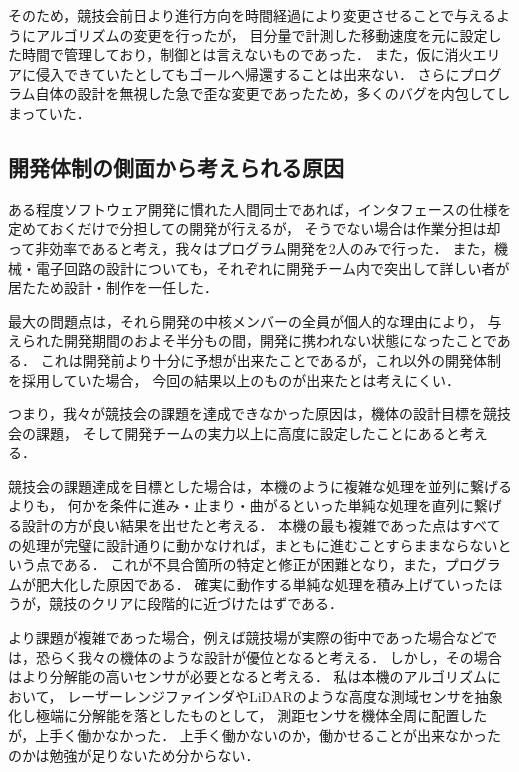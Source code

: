 \documentclass[11pt,a4]{jsarticle}
\begin{document}
    そのため，競技会前日より進行方向を時間経過により変更させることで与えるようにアルゴリズムの変更を行ったが，
    目分量で計測した移動速度を元に設定した時間で管理しており，制御とは言えないものであった．
    また，仮に消火エリアに侵入できていたとしてもゴールへ帰還することは出来ない．
    さらにプログラム自体の設計を無視した急で歪な変更であったため，多くのバグを内包してしまっていた．

  \subsection{開発体制の側面から考えられる原因} %
    ある程度ソフトウェア開発に慣れた人間同士であれば，インタフェースの仕様を定めておくだけで分担しての開発が行えるが，
    そうでない場合は作業分担は却って非効率であると考え，我々はプログラム開発を2人のみで行った．
    また，機械・電子回路の設計についても，それぞれに開発チーム内で突出して詳しい者が居たため設計・制作を一任した．

    最大の問題点は，それら開発の中核メンバーの全員が個人的な理由により，
    与えられた開発期間のおよそ半分もの間，開発に携われない状態になったことである．
    これは開発前より十分に予想が出来たことであるが，これ以外の開発体制を採用していた場合，
    今回の結果以上のものが出来たとは考えにくい．

    つまり，我々が競技会の課題を達成できなかった原因は，機体の設計目標を競技会の課題，
    そして開発チームの実力以上に高度に設定したことにあると考える．

    競技会の課題達成を目標とした場合は，本機のように複雑な処理を並列に繋げるよりも，
    何かを条件に進み・止まり・曲がるといった単純な処理を直列に繋げる設計の方が良い結果を出せたと考える．
    本機の最も複雑であった点はすべての処理が完璧に設計通りに動かなければ，まともに進むことすらままならないという点である．
    これが不具合箇所の特定と修正が困難となり，また，プログラムが肥大化した原因である．
    確実に動作する単純な処理を積み上げていったほうが，競技のクリアに段階的に近づけたはずである．

    より課題が複雑であった場合，例えば競技場が実際の街中であった場合などでは，恐らく我々の機体のような設計が優位となると考える．
    しかし，その場合はより分解能の高いセンサが必要となると考える．
    私は本機のアルゴリズムにおいて，
    レーザーレンジファインダやLiDARのような高度な測域センサを抽象化し極端に分解能を落としたものとして，
    測距センサを機体全周に配置したが，上手く働かなかった．
    上手く働かないのか，働かせることが出来なかったのかは勉強が足りないため分からない．
\end{document}

